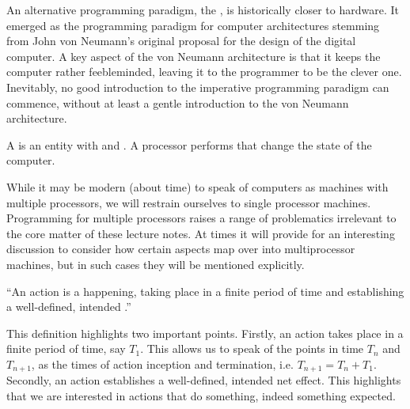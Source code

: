 
An alternative programming paradigm, the , is historically
closer to hardware. It emerged as the programming paradigm for computer
architectures stemming from John von Neumann's original proposal for the design
of the digital computer\cite{von-neumann}.  A key aspect of the von Neumann
architecture is that it keeps the computer rather feebleminded, leaving it to
the programmer to be the clever one. Inevitably, no good introduction to the
imperative programming paradigm can commence, without at least a gentle
introduction to the von Neumann architecture.

\begin{definition}

A \footnotemark is an entity with  and
. A processor performs  that change the state of
the computer.


\end{definition}

While it may be modern (about time) to speak of computers as machines with
multiple processors, we will restrain ourselves to single processor machines.
Programming for multiple processors raises a range of problematics irrelevant
to the core matter of these lecture notes. At times it will provide for an
interesting discussion to consider how certain aspects map over into
multiprocessor machines, but in such cases they will be mentioned explicitly.

\begin{definition}

``An action is a happening, taking place in a finite period of time and
establishing a well-defined, intended .''
\cite{dijkstra-introduction}

\end{definition}

This definition highlights two important points. Firstly, an action takes place
in a finite period of time, say $T_1$. This allows us to speak of the points in
time $T_n$ and $T_{n+1}$, as the times of action inception and termination,
i.e. $T_{n+1}=T_n+T_1$. Secondly, an action establishes a well-defined,
intended net effect. This highlights that we are interested in actions that do
something, indeed something expected.

